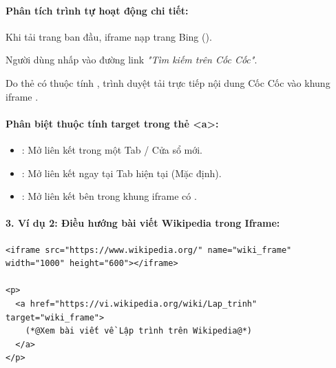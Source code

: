\paragraph{Phân tích trình tự hoạt động chi tiết:}
\begin{description}[font=\sffamily\bfseries\color{primaryBlue}, leftmargin=4.8em, style=sameline, itemsep=4pt]
    \item[{\tcbox[colback=primaryBlue,coltext=white,boxsep=1pt,left=4pt,right=4pt,top=1pt,bottom=1pt,arc=3pt,fontupper=\sffamily\tiny\bfseries]{BƯỚC 1}}] Khi tải trang ban đầu, iframe nạp trang Bing ().
    \item[{\tcbox[colback=primaryBlue,coltext=white,boxsep=1pt,left=4pt,right=4pt,top=1pt,bottom=1pt,arc=3pt,fontupper=\sffamily\tiny\bfseries]{BƯỚC 2}}] Người dùng nhấp vào đường link \textit{"Tìm kiếm trên Cốc Cốc"}.
    \item[{\tcbox[colback=primaryBlue,coltext=white,boxsep=1pt,left=4pt,right=4pt,top=1pt,bottom=1pt,arc=3pt,fontupper=\sffamily\tiny\bfseries]{BƯỚC 3}}] Do thẻ  có thuộc tính , trình duyệt tải trực tiếp nội dung Cốc Cốc vào khung iframe .
\end{description}

\paragraph{Phân biệt thuộc tính target trong thẻ <a>:}
\begin{itemize}[leftmargin=1.8em, itemsep=3pt, parsep=0pt]
    \item {}: Mở liên kết trong một Tab / Cửa sổ mới.
    \item {}: Mở liên kết ngay tại Tab hiện tại (Mặc định).
    \item {}: Mở liên kết bên trong khung iframe có .
\end{itemize}

\paragraph{3. Ví dụ 2: Điều hướng bài viết Wikipedia trong Iframe:}
\begin{codeWindow}
\begin{lstlisting}[language=HTML5]
<iframe src="https://www.wikipedia.org/" name="wiki_frame" width="1000" height="600"></iframe>

<p>
  <a href="https://vi.wikipedia.org/wiki/Lap_trinh" target="wiki_frame">
    (*@Xem bài viết về Lập trình trên Wikipedia@*)
  </a>
</p>
\end{lstlisting}
\end{codeWindow}

